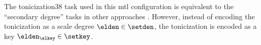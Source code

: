 

The \gls{tonicization38} task used in this \gls{mtl}
configuration is equivalent to the ``secondary degree''
tasks in other approaches
\parencite{chen2021attend,micchi2021deep}. However, instead
of encoding the tonicization as a scale degree $\elden \in
\setden$, the tonicization is encoded as a key
$\elden_\elkey \in \setkey$. 

